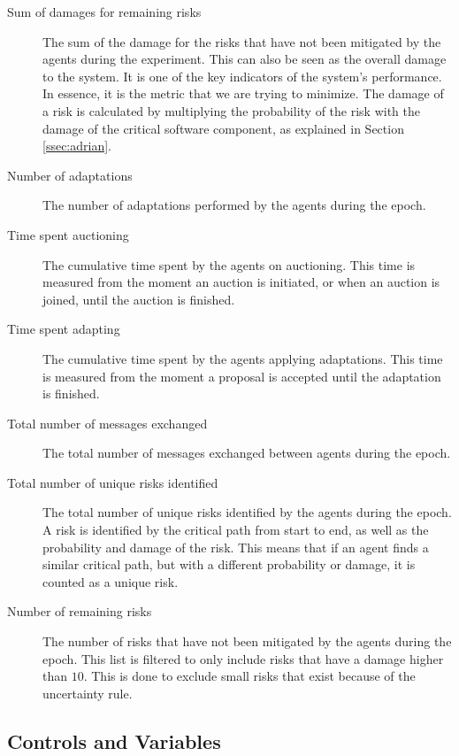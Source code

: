 \begin{description}
    \item[Sum of damages for remaining risks] The sum of the damage for the risks that have not been mitigated by the agents during the experiment. This can also be seen as the overall damage to the system. It is one of the key indicators of the system's performance. In essence, it is the metric that we are trying to minimize. The damage of a risk is calculated by multiplying the probability of the risk with the damage of the critical software component, as explained in Section \ref{ssec:adrian}. 
    \item[Number of adaptations] The number of adaptations performed by the agents during the epoch.
    \item[Time spent auctioning] The cumulative time spent by the agents on auctioning. This time is measured from the moment an auction is initiated, or when an auction is joined, until the auction is finished. 
    \item[Time spent adapting] The cumulative time spent by the agents applying adaptations. This time is measured from the moment a proposal is accepted until the adaptation is finished.
    \item[Total number of messages exchanged] The total number of messages exchanged between agents during the epoch.
    \item[Total number of unique risks identified] The total number of unique risks identified by the agents during the epoch. A risk is identified by the critical path from start to end, as well as the probability and damage of the risk. This means that if an agent finds a similar critical path, but with a different probability or damage, it is counted as a unique risk.
    \item[Number of remaining risks] The number of risks that have not been mitigated by the agents during the epoch. This list is filtered to only include risks that have a damage higher than $10$. This is done to exclude small risks that exist because of the uncertainty rule.
\end{description}

\subsection{Controls and Variables}
\label{ssec:controls-variables}


